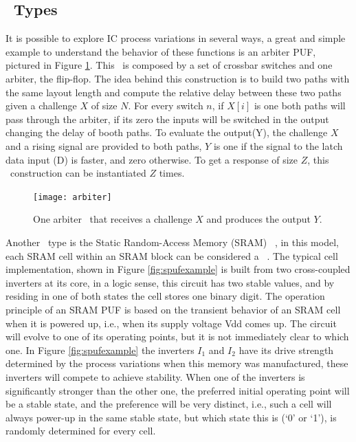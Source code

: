 \subsection{\puf~Types}
It is possible to explore IC process variations in several ways, a great and simple example to understand the behavior of these functions is an arbiter PUF, pictured in Figure \ref{fig:arbiterpuf}.
This \puf~is composed by a set of crossbar switches and one arbiter, the flip-flop. The idea behind this construction is to build two paths with the same layout length and compute the relative delay between these two paths given a challenge $X$ of size $N$.  For every switch $n$, if $X[i]$  is one both paths will pass through the arbiter, if its zero the inputs will be switched in the output changing the delay of booth paths. To evaluate the output(Y), the challenge $X$ and a rising signal are provided to both paths, $Y$ is one if the signal to the latch data input (D) is faster, and zero otherwise. To get a response of size $Z$, this \puf~construction  can be instantiated $Z$ times.

\begin{figure}[!ht]
	\centering
	\texttt{[image: arbiter]}
	\caption{One arbiter \puf~that receives a challenge $X$ and produces the output $Y$.}
	\label{fig:arbiterpuf}
\end{figure}

 Another \puf~type is the Static Random-Access Memory (SRAM) \puf~\cite{Leest2012}, in this model, each SRAM cell within an SRAM block can be considered a \puf~. The typical cell implementation, shown in Figure \ref{fig:spufexample} is built from two cross-coupled inverters at its core,%
in a logic sense, this circuit has two stable values, and by residing in one of both states the cell stores one binary digit.%
The operation principle of an SRAM PUF is based on the transient behavior of an SRAM cell when it is powered up, i.e., when its supply voltage Vdd comes up. The circuit will evolve to one of its operating points, but it is not immediately clear to which one. In Figure   \ref{fig:spufexample} the inverters $I_1$ and $I_2$ have its drive strength determined by the process variations when this memory was manufactured, these inverters will compete to achieve stability. When one of the inverters is significantly stronger than the other one, the preferred initial operating point will be a stable state, and the preference will be very distinct, i.e., such a cell will always power-up in the same stable state, but which state this is (‘0’ or ‘1’), is randomly determined for every cell.


